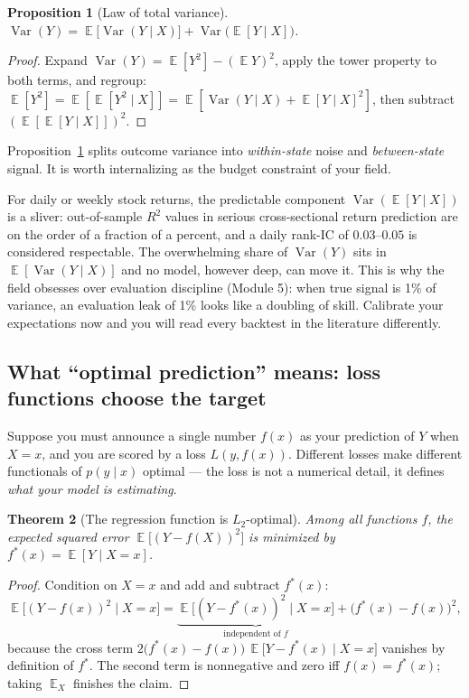 \documentclass[11pt]{article}
\numberwithin{equation}{section}
\theoremstyle{plain}
\newtheorem{theorem}{Theorem}[section]
\newtheorem{proposition}[theorem]{Proposition}
\theoremstyle{definition}
\theoremstyle{remark}
\DeclareMathOperator{\E}{\mathbb{E}}
\DeclareMathOperator{\Var}{Var}
\begin{document}
\begin{proposition}[Law of total variance]\label{prop:totalvar}
$\Var(Y) = \E\big[\Var(Y \mid X)\big] + \Var\big(\E[Y \mid X]\big)$.
\end{proposition}
\begin{proof}
Expand $\Var(Y) = \E[Y^2] - (\E Y)^2$, apply the tower property to both terms, and regroup: $\E[Y^2] = \E[\E[Y^2 \mid X]] = \E[\Var(Y\mid X) + \E[Y\mid X]^2]$, then subtract $(\E[\E[Y \mid X]])^2$.
\end{proof}

Proposition~\ref{prop:totalvar} splits outcome variance into \emph{within-state} noise and \emph{between-state} signal. It is worth internalizing as the budget constraint of your field.

\begin{finbox}
For daily or weekly stock returns, the predictable component $\Var(\E[Y \mid X])$ is a sliver: out-of-sample $R^2$ values in serious cross-sectional return prediction are on the order of a fraction of a percent, and a daily rank-IC of $0.03$--$0.05$ is considered respectable. The overwhelming share of $\Var(Y)$ sits in $\E[\Var(Y \mid X)]$ and no model, however deep, can move it. This is why the field obsesses over evaluation discipline (Module 5): when true signal is 1\% of variance, an evaluation leak of 1\% looks like a doubling of skill. Calibrate your expectations now and you will read every backtest in the literature differently.
\end{finbox}

\subsection{What ``optimal prediction'' means: loss functions choose the target}

Suppose you must announce a single number $f(x)$ as your prediction of $Y$ when $X = x$, and you are scored by a loss $L(y, f(x))$. Different losses make different functionals of $p(y \mid x)$ optimal --- the loss is not a numerical detail, it defines \emph{what your model is estimating}.

\begin{theorem}[The regression function is $L_2$-optimal]\label{thm:l2opt}
Among all functions $f$, the expected squared error $\E\big[(Y - f(X))^2\big]$ is minimized by $f^*(x) = \E[Y \mid X = x]$.
\end{theorem}
\begin{proof}
Condition on $X = x$ and add and subtract $f^*(x)$:
\[
\E\big[(Y - f(x))^2 \mid X = x\big]
= \underbrace{\E\big[(Y - f^*(x))^2 \mid X = x\big]}_{\text{independent of } f}
+ \big(f^*(x) - f(x)\big)^2,
\]
because the cross term $2\big(f^*(x) - f(x)\big)\,\E\big[Y - f^*(x) \mid X = x\big]$ vanishes by definition of $f^*$. The second term is nonnegative and zero iff $f(x) = f^*(x)$; taking $\E_X$ finishes the claim.
\end{proof}
\end{document}
